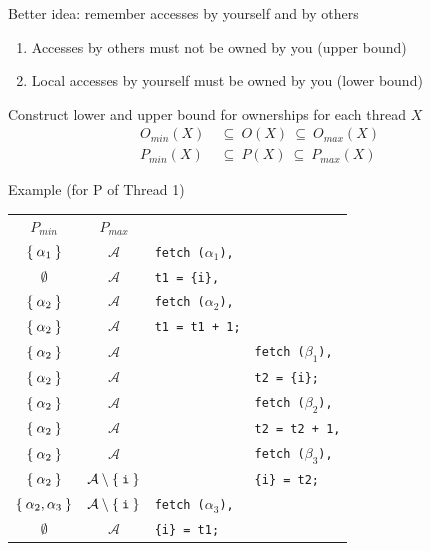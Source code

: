 \documentclass{beamer}
\begin{document}
\begin{frame}
Better idea: remember accesses by yourself and by others
\begin{enumerate} 
	\item Accesses by others must not be owned by you (upper bound)
	\item Local accesses by yourself must be owned by you (lower bound)
\end{enumerate} 
Construct lower and upper bound for ownerships for each thread $X$
\begin{align*}
	O_\mathit{min}(X)\  &\subseteq \ O(X) \ \subseteq \ O_\mathit{max}(X) 
	\\
	P_\mathit{min}(X) \ &\subseteq \ P(X) \ \subseteq \ P_\mathit{max}(X)
\end{align*}
\end{frame} 
\begin{frame}
Example (for P of Thread 1)
\begin{center}
	\begin{tabular}{ccl||l}
		$P_{min}$ & $P_{max}$ 
		\\ 
			$\Set{\alpha_1}$ 			& $\mathcal A$ 	& \texttt{fetch ($\alpha_1$),} & \\ 
			$\emptyset$		 			& $\mathcal A$ 	&  \texttt{t1 = \{i\},} & \\ 
			$\Set{\alpha_2}$		 	& $\mathcal A$ 	&  \texttt{fetch  ($\alpha_2$),} \\ 
			$\Set{\alpha_2}$		 	& $\mathcal A$ 	&  \texttt{t1 = t1 + 1;} 
		\\[4pt]
			$\Set{\alpha_2}$		 	& $\mathcal A$ 	& & \texttt{fetch ($\beta_1$),}  \\
			$\Set{\alpha_2}$		 	& $\mathcal A$ 	& & \texttt{t2 = \{i\};}
		\\[4pt] 
			$\Set{\alpha_2}$		 	& $\mathcal A$ 	& & \texttt{fetch ($\beta_2$),} \\ 
			$\Set{\alpha_2}$		 	& $\mathcal A$ 	& & \texttt{t2 = t2 + 1,} \\
			$\Set{\alpha_2}$		 	& $\mathcal A$ 	& & \texttt{fetch ($\beta_3$),} \\
			$\Set{\alpha_2}$		 	& $\mathcal A \setminus \Set{\texttt{i}}$ & & \texttt{\{i\} = t2;} 
		\\[4pt] 
			$\Set{\alpha_2, \alpha_3}$	& $\mathcal A \setminus \Set{\texttt{i}}$ & \texttt{fetch ($\alpha_3$),} & \\ 
			$\emptyset$		 	& $\mathcal A$ 		& \texttt{\{i\} = t1;} & 
	\end{tabular}
\end{center}

\end{frame}
\end{document}
